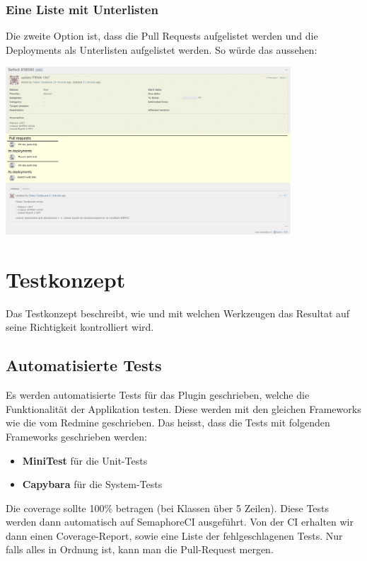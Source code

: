 \begin{minipage}{\textwidth}
\begin{minipage}{\textwidth}
    \subsubsection{Eine Liste mit Unterlisten}
    Die zweite Option ist, dass die Pull Requests aufgelistet werden und die Deployments als Unterlisten aufgelistet
    werden. So würde das aussehen: \newline
    \begin{center}
      \includegraphics[width=0.8\textwidth]{images/mockup/sublists.png}
      \label{fig:mockup_sublists}
    \end{center}
  \end{minipage}
\end{minipage}

\section{Testkonzept}
\label{sec:testkonzept}
Das Testkonzept beschreibt, wie und mit welchen Werkzeugen das Resultat auf seine Richtigkeit kontrolliert wird.

\begin{minipage}{\textwidth}
  \subsection{Automatisierte Tests}
  Es werden automatisierte Tests für das Plugin geschrieben, welche die Funktionalität der Applikation testen.
  Diese werden mit den gleichen Frameworks wie die vom Redmine geschrieben. Das heisst, dass die Tests mit
  folgenden Frameworks geschrieben werden:
  \begin{itemize}
    \item \textbf{MiniTest} für die Unit-Tests
    \item \textbf{Capybara} für die System-Tests
  \end{itemize}
  Die coverage sollte 100\% betragen (bei Klassen über 5 Zeilen). Diese Tests werden dann automatisch auf 
  SemaphoreCI ausgeführt. Von der CI erhalten wir dann einen Coverage-Report, sowie eine Liste der
  fehlgeschlagenen Tests. Nur falls alles in Ordnung ist, kann man die Pull-Request mergen.
\end{minipage}

